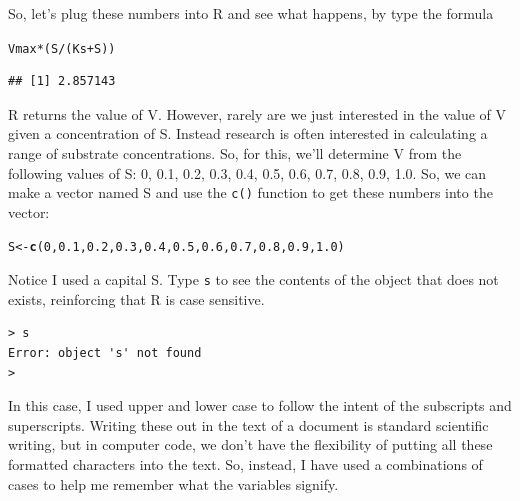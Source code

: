 \documentclass{tufte-handout}\usepackage[]{graphicx}\usepackage[]{xcolor}
\makeatletter
\newcommand{\hlnum}[1]{\textcolor[rgb]{0.686,0.059,0.569}{#1}}%
\newcommand{\hlopt}[1]{\textcolor[rgb]{0,0,0}{#1}}%
\newcommand{\hlstd}[1]{\textcolor[rgb]{0.345,0.345,0.345}{#1}}%
\newcommand{\hlkwb}[1]{\textcolor[rgb]{0.69,0.353,0.396}{#1}}%
\newcommand{\hlkwd}[1]{\textcolor[rgb]{0.737,0.353,0.396}{\textbf{#1}}}%
\newenvironment{kframe}{%
 \def\at@end@of@kframe{}%
 \ifinner\ifhmode%
  \def\at@end@of@kframe{\end{minipage}}%
  \begin{minipage}{\columnwidth}%
 \fi\fi%
 \def\FrameCommand##1{\hskip\@totalleftmargin \hskip-\fboxsep
 \colorbox{shadecolor}{##1}\hskip-\fboxsep
     \hskip-\linewidth \hskip-\@totalleftmargin \hskip\columnwidth}%
 \MakeFramed {\advance\hsize-\width
   \@totalleftmargin\z@ \linewidth\hsize
   \@setminipage}}%
 {\par\unskip\endMakeFramed%
 \at@end@of@kframe}
\newenvironment{knitrout}{}{} %
\makeatother
\begin{document}
So, let's plug these numbers into R and see what happens, by type the formula

\begin{knitrout}
\color{fgcolor}\begin{kframe}
\begin{alltt}
\hlstd{Vmax}\hlopt{*}\hlstd{(S}\hlopt{/}\hlstd{(Ks} \hlopt{+} \hlstd{S))}
\end{alltt}
\begin{verbatim}
## [1] 2.857143
\end{verbatim}
\end{kframe}
\end{knitrout}

R returns the value of V. However, rarely are we just interested in the value of V given a concentration of S. Instead research is often interested in calculating a range of substrate concentrations. So, for this, we'll determine V from the following values of S: 0, 0.1, 0.2, 0.3, 0.4, 0.5, 0.6, 0.7, 0.8, 0.9, 1.0. So, we can make a vector named S and use the \texttt{c()} function to get these numbers into the vector:
 
\begin{knitrout}
\color{fgcolor}\begin{kframe}
\begin{alltt}
\hlstd{S} \hlkwb{<-} \hlkwd{c}\hlstd{(}\hlnum{0}\hlstd{,} \hlnum{0.1}\hlstd{,} \hlnum{0.2}\hlstd{,} \hlnum{0.3}\hlstd{,} \hlnum{0.4}\hlstd{,} \hlnum{0.5}\hlstd{,} \hlnum{0.6}\hlstd{,} \hlnum{0.7}\hlstd{,} \hlnum{0.8}\hlstd{,} \hlnum{0.9}\hlstd{,} \hlnum{1.0}\hlstd{)}
\end{alltt}
\end{kframe}
\end{knitrout}

Notice I used a capital S. Type \texttt{s} to see the contents of the object that does not exists, reinforcing that R is case sensitive.  

\begin{verbatim}
> s
Error: object 's' not found
>
\end{verbatim}

In this case, I used upper and lower case to follow the intent of the subscripts and superscripts. Writing these out in the text of a document is standard scientific writing, but in computer code, we don't have the flexibility of putting all these formatted characters into the text. So, instead, I have used a combinations of cases to help me remember what the variables signify. 
\end{document}
